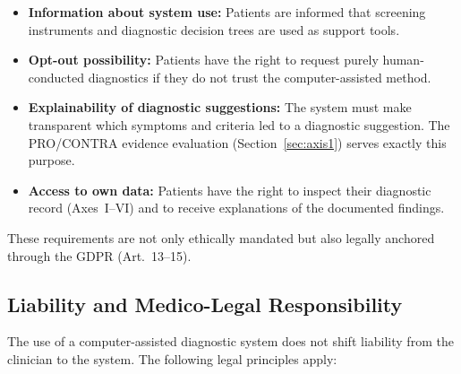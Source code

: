 \documentclass[11pt,a4paper]{article}
\begin{document}
\begin{itemize}[noitemsep]
\item \textbf{Information about system use:} Patients are informed that screening instruments and diagnostic decision trees are used as support tools.
\item \textbf{Opt-out possibility:} Patients have the right to request purely human-conducted diagnostics if they do not trust the computer-assisted method.
\item \textbf{Explainability of diagnostic suggestions:} The system must make transparent which symptoms and criteria led to a diagnostic suggestion. The PRO/CONTRA evidence evaluation (Section~\ref{sec:axis1}) serves exactly this purpose.
\item \textbf{Access to own data:} Patients have the right to inspect their diagnostic record (Axes~I--VI) and to receive explanations of the documented findings.
\end{itemize}

These requirements are not only ethically mandated but also legally anchored through the GDPR (Art.~13--15).

\subsection{Liability and Medico-Legal Responsibility}

The use of a computer-assisted diagnostic system does not shift liability from the clinician to the system. The following legal principles apply:
\end{document}
